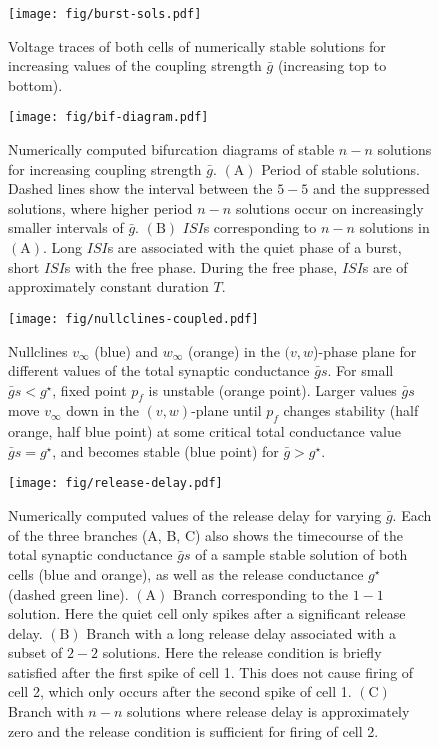 \documentclass[utf8,draft]{frontiersFPHY} %
\newcommand{\gbar}{\bar g}
\begin{document}
\begin{figure}[h!]
  \centering
  \texttt{[image: fig/burst-sols.pdf]}
  \caption{Voltage traces of both cells of numerically stable solutions for increasing values of the coupling strength $\gbar$ (increasing top to bottom).~\label{fig:burst-sols}}
\end{figure}

\begin{figure}[h!]
  \centering
  \texttt{[image: fig/bif-diagram.pdf]}
  \caption{Numerically computed bifurcation diagrams of stable $n-n$ solutions for increasing coupling strength $\gbar$. $\bm{\mathrm{(A)}}$ Period of stable solutions. Dashed lines show the interval between the $5-5$ and the suppressed solutions, where higher period $n-n$ solutions occur on increasingly smaller intervals of $\gbar$. $\bm{\mathrm{(B)}}$ $ISI$s corresponding to $n-n$ solutions in $\mathrm{(A)}$. Long $ISI$s are associated with the quiet phase of a burst, short $ISI$s with the free phase. During the free phase, $ISI$s are of approximately constant duration $T$.\label{fig:bif-diagram}}
\end{figure}

\begin{figure}[h!]
  \centering
  \texttt{[image: fig/nullclines-coupled.pdf]}
  \caption{Nullclines $v_{\infty}$ (blue) and $w_{\infty}$ (orange) in the $(v,w$)-phase plane for different values of the total synaptic conductance $\gbar s$. For small $\gbar s < g^{\star}$, fixed point $p_{f}$ is unstable (orange point). Larger values $\gbar s$ move $v_{\infty}$ down in the $(v,w)$-plane until $p_{f}$ changes stability (half orange,  half blue point) at some critical total conductance value $\gbar s = g^{\star}$, and becomes stable (blue point) for $\gbar>g^{\star}$.~\label{fig:nullclines-coupled}}
\end{figure}

\begin{figure}[h!]
  \centering
  \texttt{[image: fig/release-delay.pdf]}
  \caption{Numerically computed values of the release delay for varying $\gbar$. Each of the three branches (A, B, C) also shows the timecourse of the total synaptic conductance $\gbar s$ of a sample stable solution of both cells (blue and orange), as well as the release conductance $g^{\star}$ (dashed green line). $\bm{\mathrm{(A)}}$ Branch corresponding to the $1-1$ solution. Here the quiet cell only spikes after a significant release delay. $\bm{\mathrm{(B)}}$ Branch with a long release delay associated with a subset of $2-2$ solutions. Here the release condition is briefly satisfied after the first spike of cell 1. This does not cause firing of cell 2, which only occurs after the second spike of cell 1. $\bm{\mathrm{(C)}}$ Branch with $n-n$ solutions  where release delay is approximately zero and the release condition is sufficient for firing of cell 2.
   ~\label{fig:release-delay}}
\end{figure}
\end{document}
